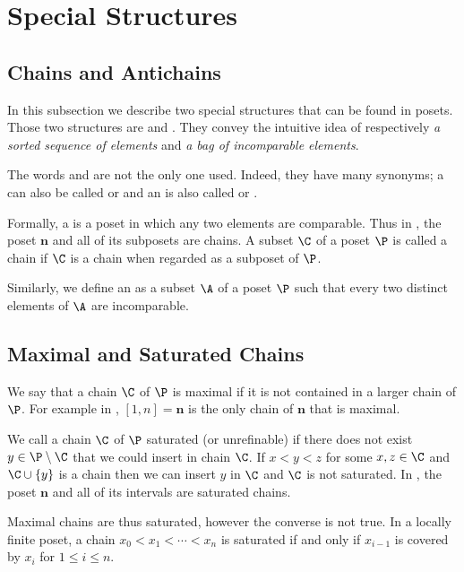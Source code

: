 \section{Special Structures}

\subsection*{Chains and Antichains}

In this subsection we describe two special structures that can be found in
posets. Those two structures are  and .
They convey the intuitive idea of respectively \emph{a sorted sequence of
elements} and \emph{a bag of incomparable elements}.

The words  and  are not the only one used.
Indeed, they have many synonyms; a  can also be called
 or  and an
 is also called  or
.


Formally, a  is a poset in which any two elements are
comparable. Thus in , the poset $\bm{n}$ and all of its
subposets are chains. A subset $\C$ of a poset $\P$ is called a chain if $\C$ is a
chain when regarded as a subposet of $\P$.

Similarly, we define an  as a subset $\A$ of a poset $\P$ such
that every two distinct elements of $\A$ are incomparable.

\subsection*{Maximal and Saturated Chains}

We say that a chain \(\C\) of \(\P\) is maximal if it is not contained in a larger
chain of $\P$. For example in , $[1, n] = \bm{n}$ is the
only chain of $\bm{n}$ that is maximal.

We call a chain $\C$ of $\P$ saturated (or unrefinable) if there does not exist
$y \in \P \setminus \C$ that we could insert in chain $\C$. If $x < y < z$ for
some $x, z \in \C$ and $\C \cup \left\{{y}\right\}$ is a chain then we can insert
$y$ in $\C$ and $\C$ is not saturated. In , the poset
$\bm{n}$ and all of its intervals are saturated chains.

Maximal chains are thus saturated, however the converse is not true. In a
locally finite poset, a chain $x_0 < x_1 < \cdots < x_n$ is saturated if and
only if $x_{i-1}$ is covered by $x_i$ for $1 \le i \le n$.


